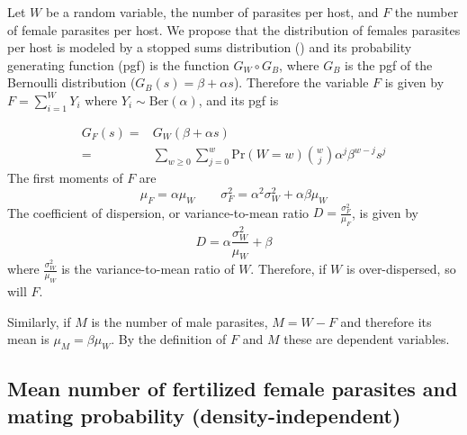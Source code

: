 \documentclass[12pt,a4paper]{article}
\theoremstyle{plain}%
\theoremstyle{definition}
\theoremstyle{remark}
\begin{document}
	
	
	Let $W$ be a random variable, the number of parasites per host, and 
	$F$ the number of female parasites per host.
	We propose that the distribution of females parasites per host is modeled by a stopped sums distribution (\cite{johnson2005univariate}) and its probability generating function (pgf) is the function $G_W \circ G_B$, where $G_B$  is the pgf of the Bernoulli distribution ($G_B(s)=\beta + \alpha s$)\cite{johnson2005univariate}. 
	Therefore the variable $F$ is given by $F=\sum_{i=1} ^W Y_i$ where $Y_i\sim \mathrm{Ber}(\alpha)$, and its pgf is 
	
	
	\begin{equation}\label{genf}
	\begin{split}
	G_F(s)=&G_W(\beta + \alpha s)\\
	=&\sum_{w\geq 0}\sum_{j=0}^{w} \mathrm{Pr}(W=w)\binom{w}{j}\alpha^j\beta^{w-j}s^j
	\end{split}
	\end{equation}
	The first moments of $F$ are
	\begin{equation}
	\mu_F=\alpha \mu_W \qquad \sigma_F^2=\alpha^2\sigma_W^2+ \alpha\beta\mu_W
	\end{equation}
	The coefficient of dispersion, or variance-to-mean ratio 
	$D=\frac{\sigma_F^2}{\mu_F}$, is given by \[D=\alpha\frac{\sigma_W^2}{\mu_W}+\beta\]
	where $\frac{\sigma_W^2}{\mu_W}$ 
	is the variance-to-mean ratio of $W$.
	Therefore, if $W$ is over-dispersed, so will $F$. 
	
	
	Similarly, if $M$ is the number of male parasites,  $M = W - F$ and therefore its mean is $\mu_M=\beta\mu_W$. By the definition of $F$ and $M$ these are dependent variables.
	
	
	
	
	
	
	
	
	
	
	
	
	
	
	
	
	
	
	
	\subsection{Mean number of fertilized female parasites and mating probability (density-independent)}
\end{document}

